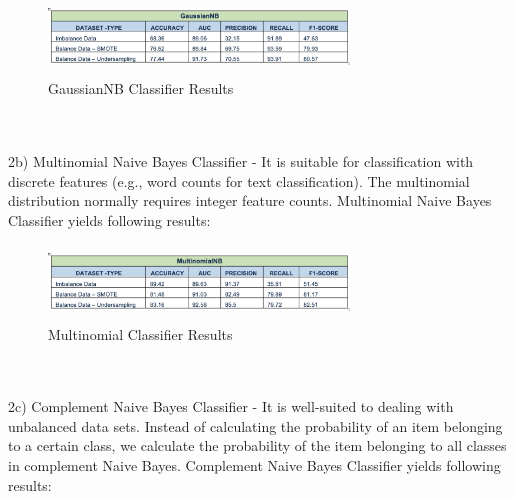 \documentclass[a4paper, 10pt, conference]{ieeeconf}      %
\begin{document}
\begin{figure}[htp]
    \centering
    \includegraphics[width=8cm,height=2cm]{Images/GaussianNB.png}
    \caption{GaussianNB Classifier Results}
    \label{fig:GaussianNB}
\end{figure}
\\\
\\2b) Multinomial Naive Bayes Classifier - It is suitable for classification with discrete features (e.g., word counts for text classification). The multinomial distribution normally requires integer feature counts. 
Multinomial Naive Bayes Classifier yields following results:

\begin{figure}[htp]
    \centering
    \includegraphics[width=8cm,height=2cm]{Images/MultinomialNB.png}
    \caption{Multinomial Classifier Results}
    \label{fig:MultinomialNB}
\end{figure}
\\\
\\2c) Complement Naive Bayes Classifier - It is well-suited to dealing with unbalanced data sets. Instead of calculating the probability of an item belonging to a certain class, we calculate the probability of the item belonging to all classes in complement Naive Bayes.
Complement Naive Bayes Classifier yields following results:
\end{document}
